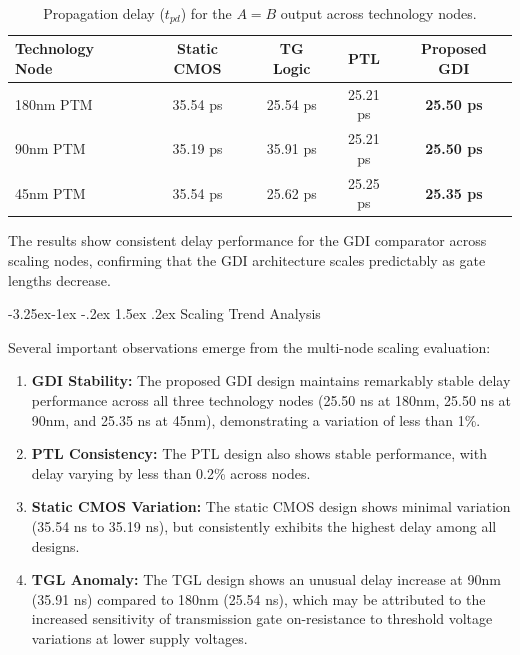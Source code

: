 \documentclass[12pt,a4paper,oneside]{report}
\makeatletter
\renewcommand\subsection{\@startsection{subsection}{2}{\z@}%
                                     {-3.25ex\@plus -1ex \@minus -.2ex}%
                                     {1.5ex \@plus .2ex}%
                                     {\normalfont\normalsize\bfseries\itshape}}
\makeatother
\begin{document}
\begin{table}[H]
\centering
\caption{Propagation delay ($t_{pd}$) for the $A=B$ output across technology nodes.}
\label{tab:res_tech_nodes}
\vspace{0.2cm}
\begin{tabular}{|l|c|c|c|c|}
\hline
\textbf{Technology Node} & \textbf{Static CMOS} & \textbf{TG Logic} & \textbf{PTL} & \textbf{Proposed GDI} \\
\hline
180nm PTM & 35.54 ps & 25.54 ps & 25.21 ps & \textbf{25.50 ps} \\
\hline
90nm PTM & 35.19 ps & 35.91 ps & 25.21 ps & \textbf{25.50 ps} \\
\hline
45nm PTM & 35.54 ps & 25.62 ps & 25.25 ps & \textbf{25.35 ps} \\
\hline
\end{tabular}
\end{table}

The results show consistent delay performance for the GDI comparator across scaling nodes, confirming that the GDI architecture scales predictably as gate lengths decrease.

\subsection{Scaling Trend Analysis}

Several important observations emerge from the multi-node scaling evaluation:

\begin{enumerate}
\item \textbf{GDI Stability:} The proposed GDI design maintains remarkably stable delay performance across all three technology nodes (25.50 ns at 180nm, 25.50 ns at 90nm, and 25.35 ns at 45nm), demonstrating a variation of less than 1\%.
\item \textbf{PTL Consistency:} The PTL design also shows stable performance, with delay varying by less than 0.2\% across nodes.
\item \textbf{Static CMOS Variation:} The static CMOS design shows minimal variation (35.54 ns to 35.19 ns), but consistently exhibits the highest delay among all designs.
\item \textbf{TGL Anomaly:} The TGL design shows an unusual delay increase at 90nm (35.91 ns) compared to 180nm (25.54 ns), which may be attributed to the increased sensitivity of transmission gate on-resistance to threshold voltage variations at lower supply voltages.
\end{enumerate}
\end{document}
